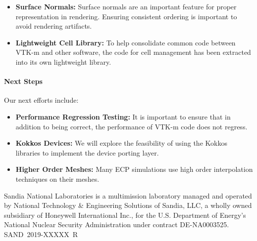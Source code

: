 \begin{itemize}
\item \textbf{Surface Normals:}
  Surface normals are an important feature for proper representation in rendering.
  Ensuring consistent ordering is important to avoid rendering artifacts.
\item \textbf{Lightweight Cell Library:}
  To help consolidate common code between VTK-m and other software, the code for cell management has been extracted into its own lightweight library.
\end{itemize}

\paragraph{Next Steps}
Our next efforts include:

\begin{itemize}
\item \textbf{Performance Regression Testing:}
  It is important to ensure that in addition to being correct, the performance of VTK-m code does not regress.
\item \textbf{Kokkos Devices:}
  We will explore the feasibility of using the Kokkos libraries to implement the device porting layer.
\item \textbf{Higher Order Meshes:}
  Many ECP simulations use high order interpolation techniques on their meshes.
\end{itemize}

\noindent
{\tiny Sandia National Laboratories is a multimission laboratory managed and operated by National Technology \& Engineering Solutions of Sandia, LLC, a wholly owned subsidiary of Honeywell International Inc., for the U.S. Department of Energy's National Nuclear Security Administration under contract DE-NA0003525. \hfill SAND~2019-XXXXX~R
\par}
